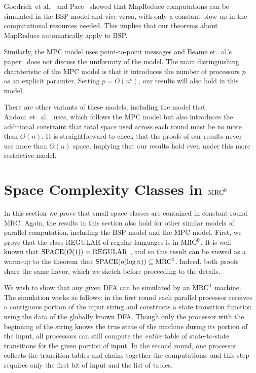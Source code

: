 \documentclass{llncs}
\newcommand{\mrc}{\textup{MRC}}
\begin{document}
Goodrich~et al.~\cite{GoodrichSZ11} and Pace~\cite{Pace12} showed that
MapReduce computations can be simulated in the BSP model and vice versa, with
only a constant blow-up in the computational resources needed.  This implies
that our theorems about MapReduce automatically apply to BSP.

Similarly, the MPC model uses point-to-point messages and Beame et.~al.'s
paper~\cite{BeameKS13} does not discuss the uniformity of the model.  The main
distinguishing charateristic of the MPC model is that it introduces the number
of processors $p$ as an explicit paramter.  Setting $p=O(n^c)$, our results
will also hold in this model.

There are other variants of these models, including the model that
Andoni~et.~al.~\cite{AndoniNOY14} uses, which follows the MPC model but also
introduces the additional constraint that total space used across each round
must be no more than $O(n)$.  It is straightforward to check that the proofs of
our results never use more than $O(n)$ space, implying that our results hold
even under this more restrictive model.

\section{Space Complexity Classes in $\mrc^0$} \label{sec:spacebound}

In this section we prove that small space classes are contained in
constant-round MRC.  Again, the results in this section also hold for other
similar models of parallel computation, including the BSP model and the MPC model.
First, we prove that the class REGULAR of regular languages
is in $\mrc^0$. It is well known that $\textup{SPACE}(O(1)) = \textup{REGULAR}$
\cite{Shepherdson59}, and so this result can be viewed as a warm-up to the
theorem that $\textup{SPACE}(o(\log n)) \subseteq \mrc^0$. Indeed, both proofs
share the same flavor, which we sketch before proceeding to the details.

We wish to show that any given DFA can be simulated by an $\mrc^0$ machine.
The simulation works as follows:
in the first round each parallel processor receives a contiguous portion of the
input string and constructs a state transition function using the data of the
globally known DFA. Though only the processor with the beginning of the string
knows the true state of the machine during its portion of the input, all
processors can still compute the \emph{entire} table of state-to-state
transitions for the given portion of input. In the second round, one processor
collects the transition tables and chains together the computations, and this
step requires only the first bit of input and the list of tables.
\end{document}
